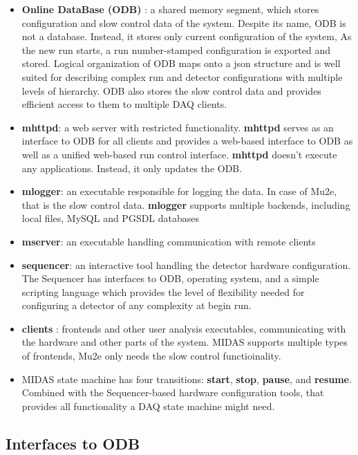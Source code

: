 \begin{itemize}
\item
  {\bf Online DataBase (ODB)} : a shared memory segment, which stores configuration and slow
  control data of the system.
  Despite its name, ODB is not a database. Instead, it stores only current configuration
  of the system, As the new run starts, a run number-stamped configuration is exported and stored.
  Logical organization of ODB maps onto a json structure and is well suited for describing
  complex run and detector configurations with multiple levels of hierarchy.
  ODB also stores the slow control data and provides efficient access to them to multiple
  DAQ clients.
\item 
  {\bf mhttpd}: a web server with restricted functionality.
  {\bf mhttpd} serves as an interface to ODB for all clients and provides
  a web-based interface to ODB as well as a unified web-based run control interface.  
  {\bf mhttpd} doesn't execute any applications. Instead, it only updates the ODB.
\item
  {\bf mlogger}: an executable responsible for logging the data. In case of Mu2e, that
  is the slow control data.
  {\bf mlogger} supports multiple backends, including local files, MySQL and PGSDL databases
\item
  {\bf mserver}: an executable handling communication with remote clients
\item
  {\bf sequencer}: an interactive tool handling the detector hardware configuration.
  The Sequencer has interfaces to ODB, operating system, and a simple scripting language
  which provides the level of flexibility needed for configuring a detector of any complexity
  at begin run.
\item
  {\bf clients} : frontends and other user analysis executables, communicating with the
  hardware and other parts of the system. MIDAS supports multiple types of frontends,
  Mu2e only needs the slow control functioinality.
\item
  MIDAS state machine has four transitions: {\bf start}, {\bf stop}, {\bf pause},
  and {\bf resume}.
  Combined with the Sequencer-based hardware configuration tools,
  that provides all functionality a DAQ state machine might need.
\end{itemize}

\subsection{Interfaces to ODB}

